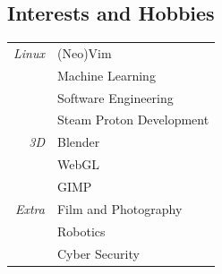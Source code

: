 \documentclass[11pt,oneside,a4paper,titlepage]{article}
\begin{document}
\begin{tcolorbox}
\begin{minipage}[t]{9cm}
\begin{tcolorbox}[grow to left by=0.55cm,colback=themeBorder,colframe=white,arc=0mm,]
      \section*{Interests and Hobbies}
      \begin{tabular}{r l}
        \emph{Linux}  & (Neo)Vim \\
                      & Machine Learning \\
                      & Software Engineering \\
                      & Steam Proton Development \\
        \emph{3D}     & Blender \\
                      & WebGL \\
                      & GIMP \\
        \emph{Extra}  & Film and Photography \\
                      & Robotics \\
                      & Cyber Security
      \end{tabular}
    \end{tcolorbox}
  \end{minipage}
\end{tcolorbox}
\end{document}
